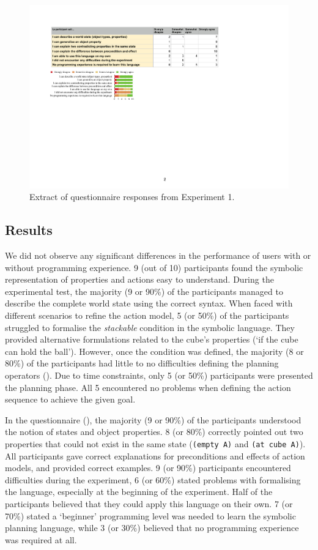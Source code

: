 \begin{figure}[ht]
	\centering
	\includegraphics[width=0.83\linewidth]{figures/eEvaluation2}
	\caption{Extract of questionnaire responses from Experiment 1.}
	\label{fig:eEvaluation2}
\end{figure} 
\vspace{-0.5cm}
\subsection{Results}
We did not observe any significant differences in the performance of users with or without programming experience.
9 (out of 10) participants found the symbolic representation of properties and actions easy to understand.
During the experimental test, the majority (9 or 90\%) of the participants managed to describe the complete world state using the correct syntax.
When faced with different scenarios to refine the action model, 5 (or 50\%) of the participants struggled to formalise the \textit{stackable} condition in the symbolic language.
They provided alternative formulations related to the cube's properties (\eg `if the cube can hold the ball').
However, once the condition was defined, the majority (8 or 80\%) of the participants had little to no difficulties defining the planning operators ().
Due to time constraints, only 5 (or 50\%) participants were presented the planning phase.
All 5 encountered no problems when defining the action sequence to achieve the given goal.

In the questionnaire (), the majority (9 or 90\%) of the participants understood the notion of states and object properties.
8 (or 80\%) correctly pointed out two properties that could not exist in the same state (\eg \texttt{(empty A)} and \texttt{(at cube A)}).
All participants gave correct explanations for preconditions and effects of action models, and provided correct examples.
9 (or 90\%) participants encountered difficulties during the experiment, 6 (or 60\%) stated problems with formalising the language, especially at the beginning of the experiment.
Half of the participants believed that they could apply this language on their own.
7 (or 70\%) stated a `beginner' programming level was needed to learn the symbolic planning language, while 3 (or 30\%) believed that no programming experience was required at all.